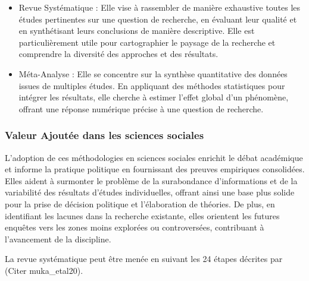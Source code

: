\documentclass[
  letterpaper,
  DIV=11,
  numbers=noendperiod]{scrreprt}
\begin{document}
\begin{itemize}
\item
  Revue Systématique : Elle vise à rassembler de manière exhaustive
  toutes les études pertinentes sur une question de recherche, en
  évaluant leur qualité et en synthétisant leurs conclusions de manière
  descriptive. Elle est particulièrement utile pour cartographier le
  paysage de la recherche et comprendre la diversité des approches et
  des résultats.
\item
  Méta-Analyse : Elle se concentre sur la synthèse quantitative des
  données issues de multiples études. En appliquant des méthodes
  statistiques pour intégrer les résultats, elle cherche à estimer
  l'effet global d'un phénomène, offrant une réponse numérique précise à
  une question de recherche.
\end{itemize}

\subsubsection{Valeur Ajoutée dans les sciences
sociales}\label{valeur-ajoutuxe9e-dans-les-sciences-sociales}

L'adoption de ces méthodologies en sciences sociales enrichit le débat
académique et informe la pratique politique en fournissant des preuves
empiriques consolidées. Elles aident à surmonter le problème de la
surabondance d'informations et de la variabilité des résultats d'études
individuelles, offrant ainsi une base plus solide pour la prise de
décision politique et l'élaboration de théories. De plus, en identifiant
les lacunes dans la recherche existante, elles orientent les futures
enquêtes vers les zones moins explorées ou controversées, contribuant à
l'avancement de la discipline.

La revue systématique peut être menée en suivant les 24 étapes décrites
par (Citer muka\_etal20).
\end{document}
